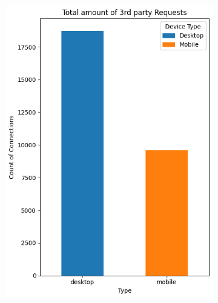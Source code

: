 \begin{figure}[h!]
\begin{subfigure}[b]{0.28\textwidth}
        \includegraphics[width=\textwidth]{./assets/comparison5.png}
        \caption{}
        \label{fig:cookies}
    \end{subfigure}
    \hfill 
    \begin{subfigure}[b]{0.28\textwidth}

\end{subfigure}
\end{figure}
